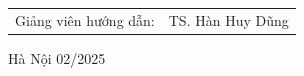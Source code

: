 \begin{titlepage}
\begin{center}
\begin{table}[H]
\begin{tabular}{l l}
                
               \fontsize{14pt}{0pt}\selectfont Giảng viên hướng dẫn: & \fontsize{14pt}{0pt}\selectfont TS. Hàn Huy Dũng \\   
          \end{tabular}
     \end{table}
     \vspace{1.3cm} %
     \fontsize{14pt}{0pt}\selectfont Hà Nội 02/2025
     \end{center}
     \end{titlepage}
     
     \cleardoublepage
     
     
